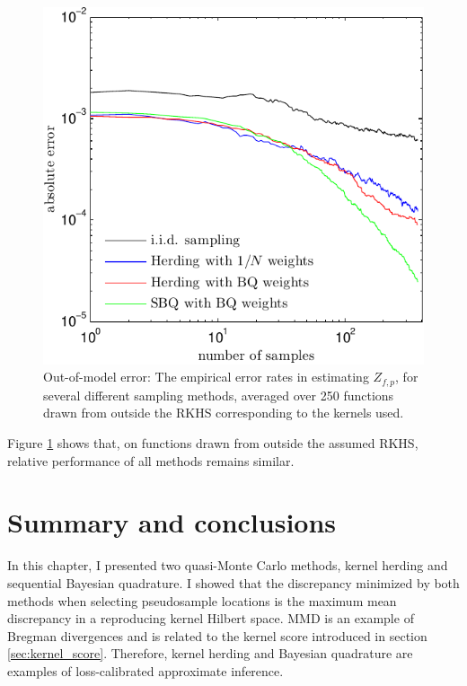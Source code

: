 \begin{figure}[h]
\centering
\includegraphics[width=.8\columnwidth]{figs/herding/error_curve_outmodel_400_v3}
\caption[Out-of-model error of Bayeisan quadrature, herding and random sampling]{Out-of-model error: The empirical error rates in estimating $Z_{f,p}$, for several different sampling methods, averaged over 250 functions drawn from outside the RKHS corresponding to the kernels used.}
\label{fig:error_curve_outmodel}
\end{figure}

Figure \ref{fig:error_curve_outmodel} shows that, on functions drawn from outside the assumed RKHS, relative performance of all methods remains similar.


\section{Summary and conclusions}

In this chapter, I presented two quasi-Monte Carlo methods, kernel herding and sequential Bayesian quadrature. I showed that the discrepancy minimized by both methods when selecting pseudosample locations is the maximum mean discrepancy in a reproducing kernel Hilbert space. MMD is an example of Bregman divergences and is related to the kernel score introduced in section \ref{sec:kernel_score}. Therefore, kernel herding and Bayesian quadrature are examples of loss-calibrated approximate inference.

